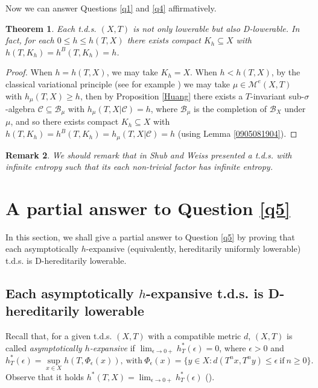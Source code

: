 \documentclass[12pt]{amsart}
\newtheorem{thm}{Theorem}[section]
\newtheorem{rem}[thm]{Remark}
\theoremstyle{definition} \theoremstyle{question}
\numberwithin{equation}{section}
\begin{document}
Now we can answer Questions \ref{q1} and \ref{q4} affirmatively.

\begin{thm} \label{0905112120}
Each t.d.s. $(X, T)$ is not only lowerable but also D-lowerable. In
fact, for each $0\le h\le h (T, X)$ there exists compact
$K_h\subseteq X$ with $h (T, K_h)= h^B (T, K_h)= h$.
\end{thm}
\begin{proof}
When $h= h (T, X)$, we may take $K_h= X$. When $h< h (T, X)$, by the
classical variational principle (see for example \cite[Corollary 8.6.1]{Wa}) we may
take $\mu\in \mathcal{M}^e (X, T)$ with $h_\mu (T, X)\ge h$, then by
Proposition \ref{Huang} there exists a $T$-invariant
sub-$\sigma$-algebra $\mathcal{C}\subseteq \mathcal{B}_\mu$ with
$h_\mu (T, X| \mathcal{C})= h$, where $\mathcal{B}_\mu$ is the
completion of $\mathcal{B}_X$ under $\mu$, and so there exists
compact $K_h\subseteq X$ with $h (T, K_h)= h^B (T, K_h)= h_\mu (T,
X| \mathcal{C})= h$ (using Lemma \ref{0905081904}).
\end{proof}

\begin{rem}
We should remark that in \cite{SW} Shub and Weiss presented a t.d.s.
with infinite entropy such that its each non-trivial factor has
infinite entropy.
\end{rem}

\section{A partial answer to Question \ref{q5}}

In this section, we shall give a partial answer to Question \ref{q5}
by proving that each asymptotically $h$-expansive (equivalently,
hereditarily uniformly lowerable) t.d.s. is D-hereditarily
lowerable. 

\subsection{Each asymptotically
$h$-expansive t.d.s. is D-hereditarily lowerable} Recall that, for a
given t.d.s. $(X, T)$ with a compatible metric $d$, $(X, T)$ is
called {\it asymptotically $h$-expansive} if
$\lim_{\epsilon\rightarrow 0+} h_T^*(\epsilon)=0$, where $\epsilon>
0$ and
\begin{equation}\label{esm}
h_T^*(\epsilon)= \sup_{x\in X} h (T, \Phi_{\epsilon} (x)), \
\text{with}\ \Phi_{\epsilon} (x)= \{y\in X: d(T^n x, T^n y)\le
\epsilon\ \text{if}\ n\ge 0\}.
\end{equation}
Observe that it holds $h^* (T, X)= \lim_{\epsilon\rightarrow 0+} h_T^*(\epsilon)$ (\cite[\S 4]{BFF}).
\end{document}
